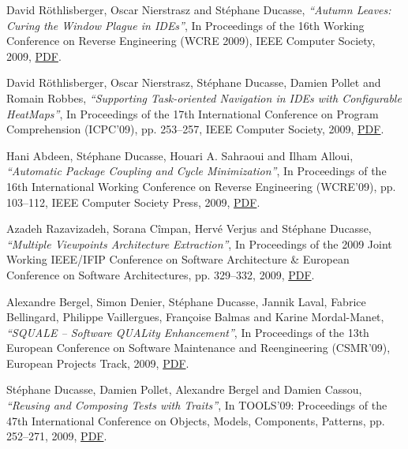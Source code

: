 \documentclass{article}
\newcommand{\czauthors}[1]{#1}
\newcommand{\cztitle}[1]{\emph{``#1''}}
\newcommand{\czbooktitle}[1]{#1}
\begin{document}
\begin{itemize}
	\pub  \czauthors{David R\"{o}thlisberger, Oscar Nierstrasz and St\'ephane Ducasse},  \cztitle{Autumn Leaves: Curing the Window Plague in IDEs},  In \czbooktitle{Proceedings of the 16th Working Conference on Reverse Engineering (WCRE 2009)}, IEEE Computer Society, 2009, \href{http://rmod-files.lille.inria.fr/Team/Texts/Papers/Roet09f-WCRE2009-AutumnLeaves-ieee.pdf}{PDF}.

	\pub  \czauthors{David R\"{o}thlisberger, Oscar Nierstrasz, St\'ephane Ducasse, Damien Pollet and Romain Robbes},  \cztitle{Supporting Task-oriented Navigation in {IDEs} with Configurable HeatMaps},  In \czbooktitle{Proceedings of the 17th International Conference on Program Comprehension (ICPC'09)}, pp. 253--257, IEEE Computer Society, 2009, \href{http://rmod-files.lille.inria.fr/Team/Texts/Papers/Roet09a-ICPC2009-HeatMaps.pdf}{PDF}.

	\pub  \czauthors{Hani Abdeen, St\'ephane Ducasse, Houari A. Sahraoui and Ilham Alloui},  \cztitle{Automatic Package Coupling and Cycle Minimization},  In \czbooktitle{Proceedings of the 16th International Working Conference on Reverse Engineering (WCRE'09)}, pp. 103--112, IEEE Computer Society Press, 2009, \href{http://rmod-files.lille.inria.fr/Team/Texts/Papers/Abde09b-WCRE2009-AutomaticPackageCoupling.pdf}{PDF}.

	\pub  \czauthors{Azadeh Razavizadeh, Sorana C\^impan, Herv\'e Verjus and St\'ephane Ducasse},  \cztitle{Multiple Viewpoints Architecture Extraction},  In \czbooktitle{Proceedings of the 2009 Joint Working IEEE/IFIP Conference on Software Architecture \& European Conference on Software Architectures}, pp. 329--332, 2009, \href{http://rmod-files.lille.inria.fr/Team/Texts/Papers/Raza09a-WASECSA-MultipleViewPoints.pdf}{PDF}.

	\pub  \czauthors{Alexandre Bergel, Simon Denier, St\'ephane Ducasse, Jannik Laval, Fabrice Bellingard, Philippe Vaillergues, Fran\c{c}oise Balmas and Karine Mordal-Manet},  \cztitle{SQUALE -- Software QUALity Enhancement},  In \czbooktitle{Proceedings of the 13th European Conference on Software Maintenance and Reengineering (CSMR'09), European Projects Track}, 2009, \href{http://rmod-files.lille.inria.fr/Team/Texts/Papers/Berg09c-CSMR2009-Squale.pdf}{PDF}.

	\pub  \czauthors{St\'ephane Ducasse, Damien Pollet, Alexandre Bergel and Damien Cassou},  \cztitle{Reusing and Composing Tests with Traits},  In \czbooktitle{TOOLS'09: Proceedings of the 47th International Conference on Objects, Models, Components, Patterns}, pp. 252--271, 2009, \href{http://rmod-files.lille.inria.fr/Team/Texts/Papers/Duca09a-Tools2009-TraitTests.pdf}{PDF}.


\end{itemize}
\end{document}
